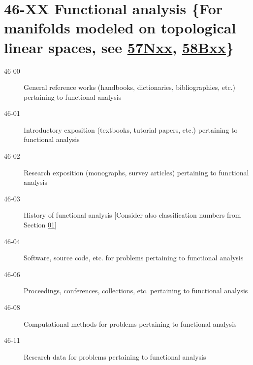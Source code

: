 \documentclass[letterpaper]{article}
\begin{document}
\section*{46-XX Functional analysis \{For manifolds modeled on topological linear spaces, see \hyperref[57Nxx]{57Nxx}, \hyperref[58Bxx]{58Bxx}\} }\label{46-XX}
\begin{description}
\item [46-00]\label{46-00} General reference works (handbooks, dictionaries, bibliographies, etc.) pertaining to functional analysis
\item [46-01]\label{46-01} Introductory exposition (textbooks, tutorial papers, etc.) pertaining to functional analysis
\item [46-02]\label{46-02} Research exposition (monographs, survey articles) pertaining to functional analysis
\item [46-03]\label{46-03} History of functional analysis [Consider also classification numbers from Section \hyperref[01-XX]{01}]
\item [46-04]\label{46-04} Software, source code, etc. for problems pertaining to functional analysis
\item [46-06]\label{46-06} Proceedings, conferences, collections, etc. pertaining to functional analysis
\item [46-08]\label{46-08} Computational methods for problems pertaining to functional analysis
\item [46-11]\label{46-11} Research data for problems pertaining to functional analysis
\end{description}
\end{document}

